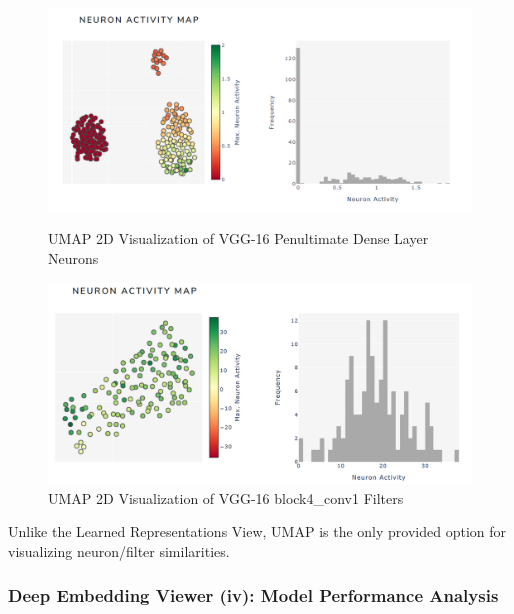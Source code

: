 \begin{figure}[H]
	\begin{minipage}{0.48\textwidth}
		\centering
		\includegraphics[width=1\linewidth]{images/embedding_view/HRV_Fig_017_DEV_Neuron_Embedding.PNG}
		\caption{UMAP 2D Visualization of VGG-16 Penultimate Dense Layer Neurons}\label{Fig:HRV_Fig_017_DEV_Neuron_Embedding}
	\end{minipage}\hfill
	\begin{minipage}{0.48\textwidth}
		\centering
		\includegraphics[width=1\linewidth]{images/embedding_view/HRV_Fig_018_DEV_Neuron_Embedding_2.PNG}
		\caption{UMAP 2D Visualization of VGG-16 block4\_conv1 Filters}\label{Fig:HRV_Fig_018_DEV_Neuron_Embedding_2}
	\end{minipage}
\end{figure}


\vspace{0.2cm}

Unlike the Learned Representations View, UMAP is the only provided option for visualizing neuron/filter similarities.

\subsubsection{Deep Embedding Viewer (iv): Model Performance Analysis}

